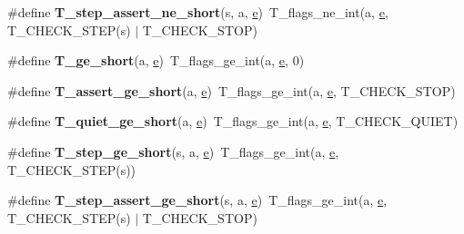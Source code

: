 \begin{DoxyCompactItemize}
\#define {\bfseries T\+\_\+step\+\_\+assert\+\_\+ne\+\_\+short}(s,  a,  \mbox{\hyperlink{sun4u_2tte_8h_a8b0b9ed08e0e18920ec2682f48228c27}{e}})~T\+\_\+flags\+\_\+ne\+\_\+int(a, \mbox{\hyperlink{sun4u_2tte_8h_a8b0b9ed08e0e18920ec2682f48228c27}{e}}, T\+\_\+\+C\+H\+E\+C\+K\+\_\+\+S\+T\+EP(s) $\vert$ T\+\_\+\+C\+H\+E\+C\+K\+\_\+\+S\+T\+OP)
\item 
\mbox{\label{group__RTEMSTestFrameworkChecksShort_gae4c56bea78dfae9c49a26b66d1bda48e}} 
\#define {\bfseries T\+\_\+ge\+\_\+short}(a,  \mbox{\hyperlink{sun4u_2tte_8h_a8b0b9ed08e0e18920ec2682f48228c27}{e}})~T\+\_\+flags\+\_\+ge\+\_\+int(a, \mbox{\hyperlink{sun4u_2tte_8h_a8b0b9ed08e0e18920ec2682f48228c27}{e}}, 0)
\item 
\mbox{\label{group__RTEMSTestFrameworkChecksShort_gaab64a9f0a000f93ba2594213df30005e}} 
\#define {\bfseries T\+\_\+assert\+\_\+ge\+\_\+short}(a,  \mbox{\hyperlink{sun4u_2tte_8h_a8b0b9ed08e0e18920ec2682f48228c27}{e}})~T\+\_\+flags\+\_\+ge\+\_\+int(a, \mbox{\hyperlink{sun4u_2tte_8h_a8b0b9ed08e0e18920ec2682f48228c27}{e}}, T\+\_\+\+C\+H\+E\+C\+K\+\_\+\+S\+T\+OP)
\item 
\mbox{\label{group__RTEMSTestFrameworkChecksShort_ga17770899dc3afb9dcf98d5d3dbc2928a}} 
\#define {\bfseries T\+\_\+quiet\+\_\+ge\+\_\+short}(a,  \mbox{\hyperlink{sun4u_2tte_8h_a8b0b9ed08e0e18920ec2682f48228c27}{e}})~T\+\_\+flags\+\_\+ge\+\_\+int(a, \mbox{\hyperlink{sun4u_2tte_8h_a8b0b9ed08e0e18920ec2682f48228c27}{e}}, T\+\_\+\+C\+H\+E\+C\+K\+\_\+\+Q\+U\+I\+ET)
\item 
\mbox{\label{group__RTEMSTestFrameworkChecksShort_ga749616981b3adc40971d9443c037d1fe}} 
\#define {\bfseries T\+\_\+step\+\_\+ge\+\_\+short}(s,  a,  \mbox{\hyperlink{sun4u_2tte_8h_a8b0b9ed08e0e18920ec2682f48228c27}{e}})~T\+\_\+flags\+\_\+ge\+\_\+int(a, \mbox{\hyperlink{sun4u_2tte_8h_a8b0b9ed08e0e18920ec2682f48228c27}{e}}, T\+\_\+\+C\+H\+E\+C\+K\+\_\+\+S\+T\+EP(s))
\item 
\mbox{\label{group__RTEMSTestFrameworkChecksShort_gadecd59b05d59e6839d1e9605fb9af872}} 
\#define {\bfseries T\+\_\+step\+\_\+assert\+\_\+ge\+\_\+short}(s,  a,  \mbox{\hyperlink{sun4u_2tte_8h_a8b0b9ed08e0e18920ec2682f48228c27}{e}})~T\+\_\+flags\+\_\+ge\+\_\+int(a, \mbox{\hyperlink{sun4u_2tte_8h_a8b0b9ed08e0e18920ec2682f48228c27}{e}}, T\+\_\+\+C\+H\+E\+C\+K\+\_\+\+S\+T\+EP(s) $\vert$ T\+\_\+\+C\+H\+E\+C\+K\+\_\+\+S\+T\+OP)

\end{DoxyCompactItemize}
